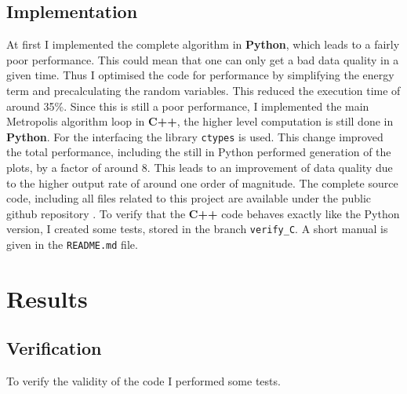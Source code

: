 \documentclass{scrartcl}
\begin{document}
	\subsection{Implementation}
		At first I implemented the complete algorithm in \textbf{Python}, which leads to a fairly poor performance.
		This could mean that one can only get a bad data quality in a given time.
		Thus I optimised the code for performance by simplifying the energy term and precalculating the random variables.
		This reduced the execution time of around 35\%.
		Since this is still a poor performance, I implemented the main Metropolis algorithm loop in \textbf{C++}, the higher level computation is still done in \textbf{Python}.
		For the interfacing the library \verb!ctypes! is used.
		This change improved the total performance, including the still in Python performed generation of the plots, by a factor of around 8.
		This leads to an improvement of data quality due to the higher output rate of around one order of magnitude.
		The complete source code, including all files related to this project are available under the public github repository \cite{github}.
		To verify that the \textbf{C++} code behaves exactly like the Python version, I created some tests, stored in the branch \verb!verify_C!.
		A short manual is given in the \verb!README.md! file.
	\section{Results}
	\subsection{Verification}
		To verify the validity of the code I performed some tests.
\end{document}
